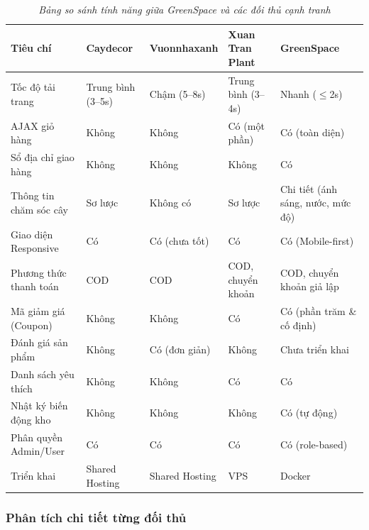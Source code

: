 \documentclass[11pt, a4paper]{article}
\begin{document}
\begin{table}[H]
    \centering
    \footnotesize
    \setlength{\tabcolsep}{2pt}
    \renewcommand{\arraystretch}{1.8}
    \caption{\textit{Bảng so sánh tính năng giữa GreenSpace và các đối thủ cạnh tranh}}
    \vspace{0.3cm}
    \begin{tabularx}{\linewidth}{|>{\raggedright\arraybackslash}p{3.0cm}
                                  |>{\centering\arraybackslash}p{1.7cm}
                                  |>{\centering\arraybackslash}p{1.9cm}
                                  |>{\centering\arraybackslash}p{1.9cm}
                                  |>{\centering\arraybackslash}p{2.0cm}|}
        \hline
        \textbf{Tiêu chí} & \textbf{Caydecor} & \textbf{Vuonnhaxanh} & \textbf{Xuan Tran Plant} & \textbf{GreenSpace} \\ \hline
        Tốc độ tải trang & Trung bình (3--5s) & Chậm (5--8s) & Trung bình (3--4s) & Nhanh (\(\leq\)2s) \\ \hline
        AJAX giỏ hàng & Không & Không & Có (một phần) & Có (toàn diện) \\ \hline
        Sổ địa chỉ giao hàng & Không & Không & Không & Có \\ \hline
        Thông tin chăm sóc cây & Sơ lược & Không có & Sơ lược & Chi tiết (ánh sáng, nước, mức độ) \\ \hline
        Giao diện Responsive & Có & Có (chưa tốt) & Có & Có (Mobile-first) \\ \hline
        Phương thức thanh toán & COD & COD & COD, chuyển khoản & COD, chuyển khoản giả lập \\ \hline
        Mã giảm giá (Coupon) & Không & Không & Có & Có (phần trăm \& cố định) \\ \hline
        Đánh giá sản phẩm & Không & Có (đơn giản) & Không & Chưa triển khai \\ \hline
        Danh sách yêu thích & Không & Không & Có & Có \\ \hline
        Nhật ký biến động kho & Không & Không & Không & Có (tự động) \\ \hline
        Phân quyền Admin/User & Có & Có & Có & Có (role-based) \\ \hline
        Triển khai & Shared Hosting & Shared Hosting & VPS & Docker \\ \hline
    \end{tabularx}
\end{table}

\subsubsection{Phân tích chi tiết từng đối thủ}
\end{document}
